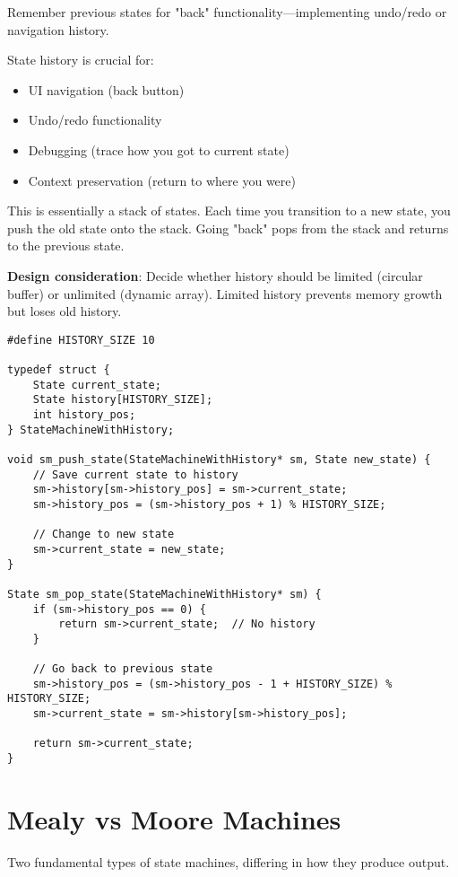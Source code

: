 Remember previous states for "back" functionality—implementing undo/redo or navigation history.

State history is crucial for:
\begin{itemize}
    \item UI navigation (back button)
    \item Undo/redo functionality
    \item Debugging (trace how you got to current state)
    \item Context preservation (return to where you were)
\end{itemize}

This is essentially a stack of states. Each time you transition to a new state, you push the old state onto the stack. Going "back" pops from the stack and returns to the previous state.

\textbf{Design consideration}: Decide whether history should be limited (circular buffer) or unlimited (dynamic array). Limited history prevents memory growth but loses old history.

\begin{lstlisting}
#define HISTORY_SIZE 10

typedef struct {
    State current_state;
    State history[HISTORY_SIZE];
    int history_pos;
} StateMachineWithHistory;

void sm_push_state(StateMachineWithHistory* sm, State new_state) {
    // Save current state to history
    sm->history[sm->history_pos] = sm->current_state;
    sm->history_pos = (sm->history_pos + 1) % HISTORY_SIZE;

    // Change to new state
    sm->current_state = new_state;
}

State sm_pop_state(StateMachineWithHistory* sm) {
    if (sm->history_pos == 0) {
        return sm->current_state;  // No history
    }

    // Go back to previous state
    sm->history_pos = (sm->history_pos - 1 + HISTORY_SIZE) % HISTORY_SIZE;
    sm->current_state = sm->history[sm->history_pos];

    return sm->current_state;
}
\end{lstlisting}

\section{Mealy vs Moore Machines}

Two fundamental types of state machines, differing in how they produce output.

